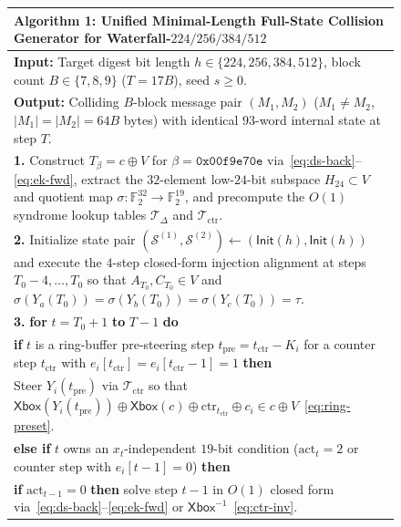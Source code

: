 \documentclass[11pt,a4paper]{article}
\theoremstyle{definition}
\theoremstyle{remark}
\newcommand{\Ftwo}{\mathbb{F}_2}
\newcommand{\Xbox}{\mathsf{Xbox}}
\begin{document}
\begin{figure}[t]
\centering
\small
\begin{tabular}{@{}p{}@{}}
\toprule
\textbf{Algorithm 1:} Unified Minimal-Length Full-State Collision Generator for Waterfall-$224/256/384/512$ \\
\midrule
\textbf{Input:} Target digest bit length $h \in \{224, 256, 384, 512\}$, block count $B \in \{7, 8, 9\}$ ($T = 17 B$), seed $s \ge 0$. \\
\textbf{Output:} Colliding $B$-block message pair $(M_1, M_2)$ ($M_1 \neq M_2$, $|M_1| = |M_2| = 64 B$ bytes) with identical $93$-word internal state at step $T$. \\[2pt]
\textbf{1.} Construct $T_\beta = c \oplus V$ for $\beta = \mathtt{0x00f9e70e}$ via~\eqref{eq:ds-back}--\eqref{eq:ek-fwd}, extract the $32$-element low-$24$-bit subspace $H_{24} \subset V$ and quotient map $\sigma : \Ftwo^{32} \to \Ftwo^{19}$, and precompute the $O(1)$ syndrome lookup tables $\mathcal{T}_{\Delta}$ and $\mathcal{T}_{\mathrm{ctr}}$. \\
\textbf{2.} Initialize state pair $(\mathcal{S}^{(1)}, \mathcal{S}^{(2)}) \leftarrow (\mathsf{Init}(h), \mathsf{Init}(h))$ and execute the $4$-step closed-form injection alignment at steps $T_0 - 4, \dots, T_0$ so that $A_{T_0}, C_{T_0} \in V$ and $\sigma(Y_a(T_0)) = \sigma(Y_b(T_0)) = \sigma(Y_c(T_0)) = \tau$. \\
\textbf{3.} \textbf{for} $t = T_0 + 1$ \textbf{to} $T - 1$ \textbf{do} \\
\hspace*{1.8em} \textbf{if} $t$ is a ring-buffer pre-steering step $t_{\mathrm{pre}} = t_{\mathrm{ctr}} - K_i$ for a counter step $t_{\mathrm{ctr}}$ with $e_i[t_{\mathrm{ctr}}] = e_i[t_{\mathrm{ctr}}-1] = 1$ \textbf{then} \\
\hspace*{3.6em} Steer $Y_i(t_{\mathrm{pre}})$ via $\mathcal{T}_{\mathrm{ctr}}$ so that $\Xbox(Y_i(t_{\mathrm{pre}})) \oplus \Xbox(c) \oplus \mathrm{ctr}_{t_{\mathrm{ctr}}} \oplus c_i \in c \oplus V$~\eqref{eq:ring-preset}. \\
\hspace*{1.8em} \textbf{else if} $t$ owns an $x_t$-independent $19$-bit condition ($\mathrm{act}_t = 2$ or counter step with $e_i[t-1] = 0$) \textbf{then} \\
\hspace*{3.6em} \textbf{if} $\mathrm{act}_{t-1} = 0$ \textbf{then} solve step $t - 1$ in $O(1)$ closed form via~\eqref{eq:ds-back}--\eqref{eq:ek-fwd} or $\Xbox^{-1}$~\eqref{eq:ctr-inv}. \\

\end{tabular}
\end{figure}
\end{document}
